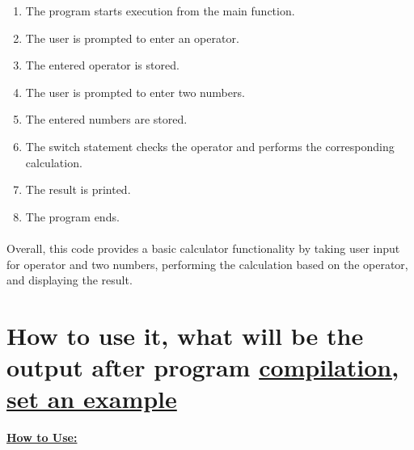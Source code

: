 \documentclass[a4paper,12pt]{article}
\begin{document}
\begin{enumerate}
\item{The program starts execution from the main function.}\\
\item The user is prompted to enter an operator.\\
\item The entered operator is stored.\\
\item The user is prompted to enter two numbers.\\
\item The entered numbers are stored.\\
\item The switch statement checks the operator and performs the corresponding calculation.\\
\item The result is printed.\\
\item The program ends.\\
\end{enumerate}

\paragraph{}
Overall, this code provides a basic calculator functionality by taking user input for operator and two numbers, performing the calculation based on the operator, and displaying the result.


\section*{\large{How to use it, what will be the output after program \underline{compilation, set an example}}}


\begin{flushleft}
    \underline{\textbf{How to Use:}}
\end{flushleft}
\end{document}
